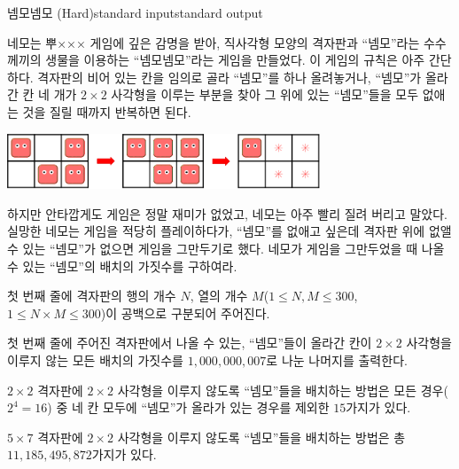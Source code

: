 \begin{problem}{넴모넴모 (Hard)}{standard input}{standard output}

네모는 뿌××× 게임에 깊은 감명을 받아, 직사각형 모양의 격자판과 ``넴모''라는 수수께끼의 생물을 이용하는 ``넴모넴모''라는 게임을 만들었다. 이 게임의 규칙은 아주 간단하다. 격자판의 비어 있는 칸을 임의로 골라 ``넴모''를 하나 올려놓거나, ``넴모''가 올라간 칸 네 개가 $2 \times 2$ 사각형을 이루는 부분을 찾아 그 위에 있는 ``넴모''들을 모두 없애는 것을 질릴 때까지 반복하면 된다.

\begin{center}
  \includegraphics[width=0.7\textwidth]{nemo.png}
\end{center}

하지만 안타깝게도 게임은 정말 재미가 없었고, 네모는 아주 빨리 질려 버리고 말았다. 실망한 네모는 게임을 적당히 플레이하다가, ``넴모''를 없애고 싶은데 격자판 위에 없앨 수 있는 ``넴모''가 없으면 게임을 그만두기로 했다. 네모가 게임을 그만두었을 때 나올 수 있는 ``넴모''의 배치의 가짓수를 구하여라.

\InputFile
첫 번째 줄에 격자판의 행의 개수 $N$, 열의 개수 $M$($1 \le N, M \le 300$, $1 \le N \times M \le 300$)이 공백으로 구분되어 주어진다.

\OutputFile
첫 번째 줄에 주어진 격자판에서 나올 수 있는, ``넴모''들이 올라간 칸이 $2 \times 2$ 사각형을 이루지 않는 모든 배치의 가짓수를 $1,000,000,007$로 나눈 나머지를 출력한다.

\Example

\begin{example}
%
%
%
\end{example}

\Notes
$2 \times 2$ 격자판에 $2 \times 2$ 사각형을 이루지 않도록 ``넴모''들을 배치하는 방법은 모든 경우($2^{4}=16$) 중 네 칸 모두에 ``넴모''가 올라가 있는 경우를 제외한 $15$가지가 있다.

$5 \times 7$ 격자판에 $2 \times 2$ 사각형을 이루지 않도록 ``넴모''들을 배치하는 방법은 총 $11,185,495,872$가지가 있다.

\end{problem}
